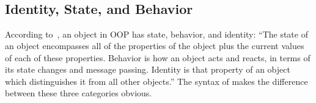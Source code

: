 \begin{figure*}
\begin{multicols}{2}
\begin{tabbing}
  \> \alt {}  \\
  \> \alt {}   \\
 \df {} \alt {} \alt {} \alt \V{\$} \\
  \> \alt \V{\^{}} \alt \V{*} \alt {}  \\
 \df {} \alt {} \alt {} \\
  \> \alt {} \alt {} \alt {} \\
 \df {}  \\
 \df \RE{[\textbackslash{}dA-F][\textbackslash{}dA-F]} \\
 \df {} \\
 \df {} \\
 \df {} \\
 \df {} \\
 \df {}  \\
 \df {} \\
\end{tabbing}
\end{multicols}
\label{fig:bnf}
\end{figure*}

\subsection{Identity, State, and Behavior}

According to~\citet{grady2007object}, an object in OOP has state, behavior, and identity:
``The state of an object encompasses all of the properties of
the object plus the current values of each of these properties.
Behavior is how an object acts and reacts, in terms of its state changes and message passing.
Identity is that property of an object which distinguishes it from all other objects.''
The syntax of \eo{} makes the difference between these three categories obvious.

